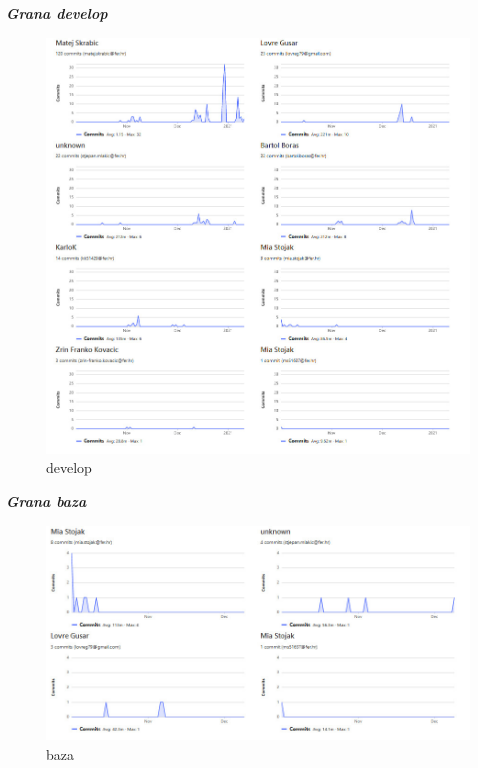 	\begin{packed_item}
		\item \textbf{\textit{Grana develop}}\\
		
		\begin{figure}[h!]
			\centering
			\includegraphics[width=\linewidth]{./slike/develop.jpeg}
			\caption{develop}
		\end{figure}
		\eject
	\end{packed_item}

		\begin{packed_item}
			\item \textbf{\textit{Grana baza}}\\
			
			\begin{figure}[h!]
				\centering
				\includegraphics[width=\linewidth]{./slike/baze.jpeg}
				\caption{baza}
			\end{figure}
			\eject
		\end{packed_item}
		
	